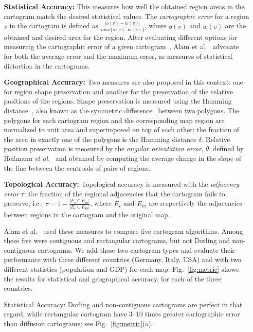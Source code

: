 \documentclass[10pt,journal,compsoc]{IEEEtran}
\def\toperror{\tau}
\def\angular{\theta}
\def\tsdist{\delta}
\begin{document}
\textbf{Statistical Accuracy:}
This measures how well the obtained region areas in the cartogram match the desired statistical values. 
The \textit{cartographic error} for a region $v$ in the cartogram is defined as $\frac{|o(v)-w(v)|}{max\{o(v),w(v)\}}$, where $o(v)$ and $w(v)$ are the obtained and desired area for the region. After evaluating different options for measuring the cartographic error of a given cartogram~\cite{KNPS03,KNP04,BSV12}, Alam et al.~\cite{AKV15} advocate for both the average error and the maximum error, as measures of statistical distortion in the cartograms.

\label{stat}
\textbf{Geographical Accuracy: } 
Two measures are also proposed in this context: one for region shape preservation and another for the preservation of the relative positions of the regions. 
Shape preservation is measured using the Hamming distance~\cite{SKI98}, also known as the symmetric difference~\cite{MRS10} between two polygons. The polygons for each cartogram region and the corresponding map region are normalized to unit area and superimposed on top of each other; the fraction of the area in exactly one of the polygons is the Hamming distance $\tsdist$. Relative position preservation is measured by the \textit{angular orientation error}, $\angular$, defined by Heilmann \textit{et al.}~\cite{hkps04} and obtained by computing the average change in the slope of the line between the centroids of pairs of regions.

\textbf{Topological Accuracy:} 
Topological accuracy is measured with the \textit{adjacency error} $\toperror$: the fraction of the regional adjacencies that the cartogram fails to preserve, i.e., $\toperror = 1 - \frac{|E_c\cap E_m|}{|E_c\cup E_m|}$, where $E_c$ and $E_m$ are respectively the adjacencies between regions in the cartogram and the original map.
\medskip

Alam et al.~\cite{AKV15} used these measures to compare five cartogram algorithms.
Among these five were contiguous and rectangular cartograms, but not Dorling and non-contiguous cartograms. We add these two cartogram types and evaluate their performance with three different countries (Germany, Italy, USA) and with two different statistics (population and GDP) for each map. Fig.~\ref{fig:metric} shows the results for statistical and geographical accuracy, for each of the three countries. 


Statistical Accuracy: Dorling and non-contiguous cartograms are perfect in that regard, while rectangular cartogram have 3--10 times greater cartographic error than diffusion cartograms; see Fig.~\ref{fig:metric}(a).
\end{document}
